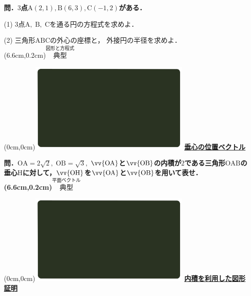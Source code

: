 \documentclass[10pt,
fleqn,
dvipdfmx,
uplatex
]{jsarticle}
\begin{document}
\normalsize 
\bf\boldmath 問．$3$点$\text{A}\left(2,1\right),\text{B}\left(6,3\right),\text{C}\left(-1,2\right)$がある．

\normalsize
\vspace{0.3zw}
(1)  $3$点$\text{A},\;\text{B},\;\text{C}$を通る円の方程式を求めよ．

\LARGE
(2)  三角形$\text{ABC}$の外心の座標と，
外接円の半径を求めよ．\\

\at(6.6cm,0.2cm){\small\color{bradorange}$\overset{\text{図形と方程式}}{\text{典型}}$}

\newpage



\at(0cm,0cm){\includegraphics[width=8cm,bb=0 0 1920 1080]{./youtube/thumbnails/templates/smart_background/平面ベクトル.jpeg}}
{\color{orange}\bf\boldmath\LARGE\underline{垂心の位置ベクトル}}\vspace{0.3zw}

\Large 
\bf\boldmath 問．$\text{OA}=2\sqrt 2,\;\text{OB}=\sqrt 3,\;$$\vv{\text{OA}}$と$\vv{\text{OB}}$の内積が$2$である三角形$\text{OAB}$の垂心$\text{H}$に対して，$\vv{\text{OH}}$を$\vv{\text{OA}}$と$\vv{\text{OB}}$を用いて表せ．
\at(6.6cm,0.2cm){\small\color{bradorange}$\overset{\text{平面ベクトル}}{\text{典型}}$}


\newpage



\at(0cm,0cm){\includegraphics[width=8cm,bb=0 0 1920 1080]{./youtube/thumbnails/templates/smart_background/平面ベクトル.jpeg}}
{\color{orange}\bf\boldmath\LARGE\underline{内積を利用した図形証明}}\vspace{0.3zw}
\end{document}
